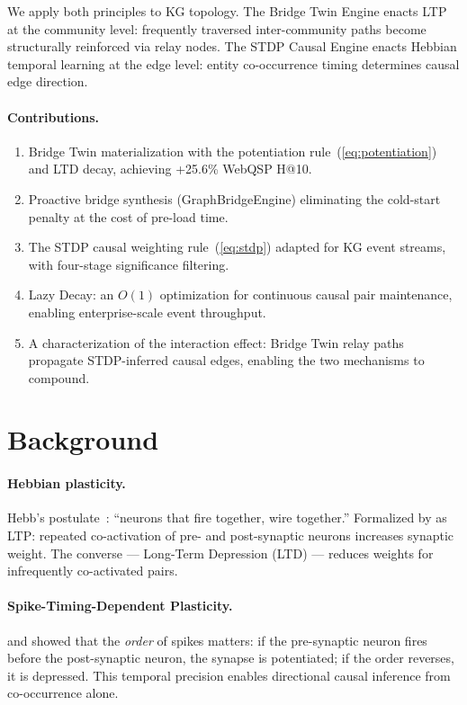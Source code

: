 \documentclass[10pt,twocolumn]{article}
\begin{document}
We apply both principles to KG topology. The Bridge Twin Engine enacts LTP at the
community level: frequently traversed inter-community paths become structurally
reinforced via relay nodes. The STDP Causal Engine enacts Hebbian temporal learning
at the edge level: entity co-occurrence timing determines causal edge direction.

\paragraph{Contributions.}
\begin{enumerate}
  \item Bridge Twin materialization with the potentiation rule~(\ref{eq:potentiation})
        and LTD decay, achieving +25.6\% WebQSP H@10.
  \item Proactive bridge synthesis (GraphBridgeEngine) eliminating the cold-start penalty
        at the cost of pre-load time.
  \item The STDP causal weighting rule~(\ref{eq:stdp}) adapted for KG event streams,
        with four-stage significance filtering.
  \item Lazy Decay: an $O(1)$ optimization for continuous causal pair maintenance,
        enabling enterprise-scale event throughput.
  \item A characterization of the interaction effect: Bridge Twin relay paths
        propagate STDP-inferred causal edges, enabling the two mechanisms to compound.
\end{enumerate}

\section{Background}
\label{sec:background}

\paragraph{Hebbian plasticity.}
Hebb's postulate~\cite{hebb1949}: ``neurons that fire together, wire together.''
Formalized by \citet{bipoo1998} as LTP: repeated co-activation of pre- and
post-synaptic neurons increases synaptic weight. The converse — Long-Term Depression
(LTD) — reduces weights for infrequently co-activated pairs.

\paragraph{Spike-Timing-Dependent Plasticity.}
\citet{markram1997} and \citet{bipoo1998} showed that the \emph{order} of spikes
matters: if the pre-synaptic neuron fires before the post-synaptic neuron, the synapse
is potentiated; if the order reverses, it is depressed. This temporal precision enables
directional causal inference from co-occurrence alone.
\end{document}
